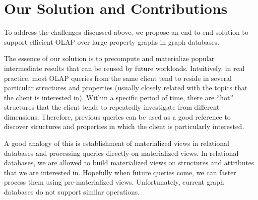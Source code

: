 \section{Our Solution and Contributions}
To address the challenges discussed above, we propose an end-to-end solution to  support efficient  OLAP over large property graphs in graph databases.

The essence of our solution is to precompute and materialize popular intermediate results that can be reused by future workloads. Intuitively, in real practice, most OLAP queries from the same client   tend to reside in several particular structures and properties (usually closely related with the topics that the client is interested in). Within a specific period of time, there are ``hot'' structures that the client tends to repeatedly investigate from different dimensions. Therefore, previous queries can be used as a good reference to discover structures and properties in which the client is particularly interested.





A good analogy of this is establishment of materialized views in relational databases and processing queries directly on materialized views. In relational databases, we are allowed to build materialized views on structures and attributes that we are interested in. Hopefully when future queries come, we can faster process them using pre-materialized views. Unfortunately, current graph databases do not support similar operations.


